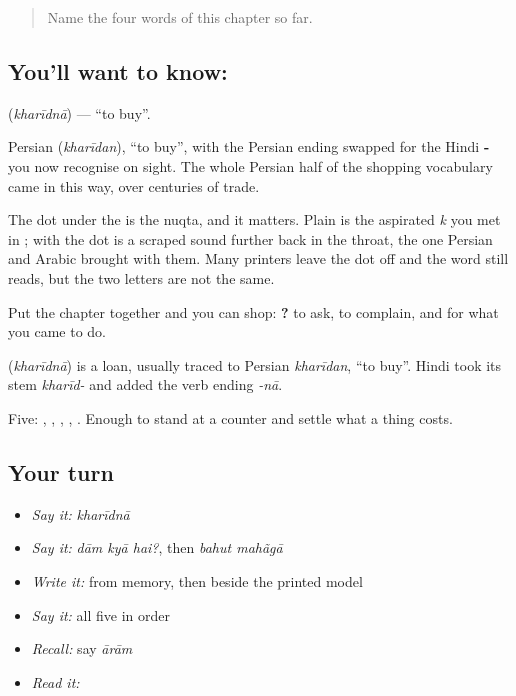 \label{lesson:HI-C72-buy}



\begin{quote}
Name the four words of this chapter so far.
\end{quote}

\subsection*{You'll want to know: }
\textbf{} (\emph{kharīdnā}) — \textquotedblleft{}to buy\textquotedblright{}.

Persian  (\emph{kharīdan}), \textquotedblleft{}to buy\textquotedblright{}, with the Persian ending swapped for the Hindi \textbf{-} you now recognise on sight. The whole Persian half of the shopping vocabulary came in this way, over centuries of trade.

The dot under the  is the nuqta, and it matters. Plain \textbf{} is the aspirated \emph{k} you met in \textbf{}; \textbf{} with the dot is a scraped sound further back in the throat, the one Persian and Arabic brought with them. Many printers leave the dot off and the word still reads, but the two letters are not the same.

Put the chapter together and you can shop: \textbf{  ?} to ask, \textbf{ } to complain, and  for what you came to do.

\begin{cousinweb}
\textbf{} (\emph{kharīdnā}) is a loan, usually traced to Persian \emph{kharīdan}, \textquotedblleft{}to buy\textquotedblright{}. Hindi took its stem \emph{kharīd-} and added the verb ending \emph{-nā}.
\end{cousinweb}

\begin{grammarlens}[title={What you've built}]
Five: , , , , . Enough to stand at a counter and settle what a thing costs.
\end{grammarlens}

\subsection*{Your turn}
\begin{itemize}
\raggedright
  \item \emph{Say it:} \emph{kharīdnā}
  \item \emph{Say it:} \emph{dām kyā hai?}, then \emph{bahut mahãgā}
  \item \emph{Write it:}  from memory, then  beside the printed model
  \item \emph{Say it:} all five in order
  \item \emph{Recall:} say \emph{ārām}
  \item \emph{Read it:} \textbf{}
\end{itemize}

